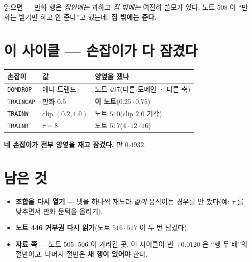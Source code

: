 \documentclass[11pt]{article}
\begin{document}
읽으면 --- 만화 행은 \emph{집안에는} 과하고 \emph{집 밖에는} 여전히
쓸모가 있다. 노트 508 이 ``만화는 받기만 하고 안 준다''고 했는데,
\textbf{집 밖에는 준다.}

\section*{이 사이클 --- 손잡이가 다 잠겼다}

\begin{center}
\begin{tabular}{lll}
\hline
손잡이 & 값 & 양옆을 쟀나 \\
\hline
\texttt{DOMDROP} & 애니 트렌드 & 노트 $497$(다른 도메인 · 다른 축) \\
\texttt{TRAINCAP} & 만화 $0.5$ & \textbf{이 노트}($0.25 \cdot 0.75$) \\
\texttt{TRAINW} & clip $(0.2, 1.0)$ & 노트 $510$(clip $2.0$ 기각) \\
\texttt{TRAINR} & $\tau = 8$ & 노트 $517$($4 \cdot 12 \cdot 16$) \\
\hline
\end{tabular}
\end{center}

\textbf{네 손잡이가 전부 양옆을 재고 잠겼다.} 판 $\mathbf{0.4932}$.

\section*{남은 것}

\begin{itemize}
\item \textbf{조합을 다시 열기} --- 넷을 하나씩 재느라 \emph{같이} 움직이는
경우를 안 봤다(예: $\tau$ 를 낮추면서 만화 문턱을 올리기).
\item \textbf{노트 446 거부권 다시 읽기}(노트 $516 \cdot 517$ 이 두 번
남겼다).
\item \textbf{자료 쪽} --- 노트 $505 \cdot 506$ 이 가리킨 곳. 이 사이클이
번 $+0.0120$ 은 ``행 두 배''의 절반이고, 나머지 절반은 \textbf{새 행이
있어야} 한다.
\end{itemize}
\end{document}
